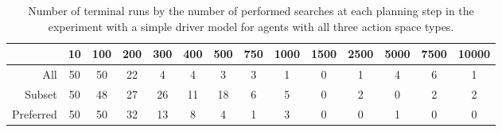 \begin{table}[htbp]
\footnotesize
\centering
\centerfloat
\begin{tabular}{@{}rccccccccccccc@{}}
\toprule
                    & 10 & 100 & 200 & 300 & 400 & 500 & 750 & 1000 & 1500 & 2500 & 5000 & 7500 & 10000 \\ \midrule
All       & 50 & 50  & 22  & 4   & 4   & 3   & 3   & 1    & 0    & 1    & 4    & 6    & 1     \\
Subset     & 50 & 48  & 27  & 26  & 11  & 18  & 6   & 5    & 0    & 2    & 0    & 2    & 2     \\
Preferred & 50 & 50  & 32  & 13  & 8   & 4   & 1   & 3    & 0    & 0    & 1    & 0    & 0     \\ \bottomrule
\end{tabular}
\caption[Number of terminal runs by the number of performed searches]{Number of terminal runs by the number of performed searches at each planning step in the experiment with a simple driver model for agents with all three action space types.}
\label{tab:simple_terminal}
\end{table}